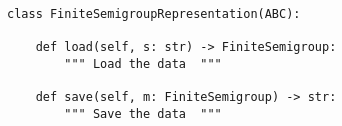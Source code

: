 \begin{verbatim}
class FiniteSemigroupRepresentation(ABC):

    def load(self, s: str) -> FiniteSemigroup:
        """ Load the data  """

    def save(self, m: FiniteSemigroup) -> str:
        """ Save the data  """
\end{verbatim}